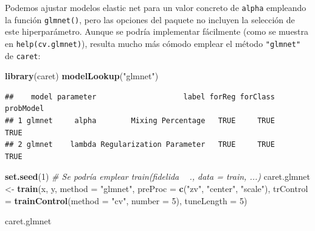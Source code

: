 \documentclass[
  spanish,
]{book}
\newenvironment{Shaded}{\begin{snugshade}}{\end{snugshade}}
\newcommand{\CommentTok}[1]{\textcolor[rgb]{0.56,0.35,0.01}{\textit{#1}}}
\newcommand{\DataTypeTok}[1]{\textcolor[rgb]{0.13,0.29,0.53}{#1}}
\newcommand{\DecValTok}[1]{\textcolor[rgb]{0.00,0.00,0.81}{#1}}
\newcommand{\KeywordTok}[1]{\textcolor[rgb]{0.13,0.29,0.53}{\textbf{#1}}}
\newcommand{\NormalTok}[1]{#1}
\newcommand{\StringTok}[1]{\textcolor[rgb]{0.31,0.60,0.02}{#1}}
\theoremstyle{break}
\theoremstyle{definition}
\theoremstyle{definition}
\theoremstyle{definition}
\theoremstyle{remark}
\begin{document}
Podemos ajustar modelos elastic net para un valor concreto de \texttt{alpha} empleando la función \texttt{glmnet()}, pero las opciones del paquete no incluyen la selección de este hiperparámetro.
Aunque se podría implementar fácilmente (como se muestra en \texttt{help(cv.glmnet)}), resulta mucho más cómodo emplear el método \texttt{"glmnet"} de \texttt{caret}:

\begin{Shaded}
\begin{Highlighting}[]
\KeywordTok{library}\NormalTok{(caret)}
\KeywordTok{modelLookup}\NormalTok{(}\StringTok{"glmnet"}\NormalTok{) }
\end{Highlighting}
\end{Shaded}

\begin{verbatim}
##    model parameter                    label forReg forClass probModel
## 1 glmnet     alpha        Mixing Percentage   TRUE     TRUE      TRUE
## 2 glmnet    lambda Regularization Parameter   TRUE     TRUE      TRUE
\end{verbatim}

\begin{Shaded}
\begin{Highlighting}[]
\KeywordTok{set.seed}\NormalTok{(}\DecValTok{1}\NormalTok{)}
\CommentTok{# Se podría emplear train(fidelida ~ ., data = train, ...)}
\NormalTok{caret.glmnet <-}\StringTok{ }\KeywordTok{train}\NormalTok{(x, y, }\DataTypeTok{method =} \StringTok{"glmnet"}\NormalTok{,}
    \DataTypeTok{preProc =} \KeywordTok{c}\NormalTok{(}\StringTok{"zv"}\NormalTok{, }\StringTok{"center"}\NormalTok{, }\StringTok{"scale"}\NormalTok{),}
    \DataTypeTok{trControl =} \KeywordTok{trainControl}\NormalTok{(}\DataTypeTok{method =} \StringTok{"cv"}\NormalTok{, }\DataTypeTok{number =} \DecValTok{5}\NormalTok{),}
    \DataTypeTok{tuneLength =} \DecValTok{5}\NormalTok{)}


\NormalTok{caret.glmnet}
\end{Highlighting}
\end{Shaded}
\end{document}
